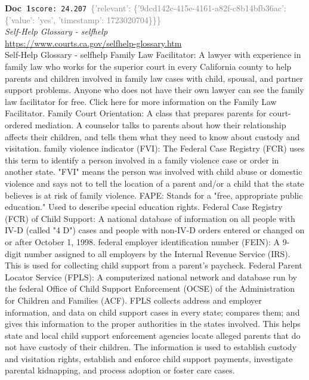 \documentclass[a4paper,11pt]{article}
\begin{document}
\begin{docenv}
{\footnotesize\textcolor{doccolor}{\textbf{Doc~1}}}\hfill{\tiny\texttt{score:~24.207}}\ {\tiny\textcolor{gray}{\{'relevant': \{'9dcd142c-415e-4161-a82f-c8b14bfb36ac': \{'value': 'yes', 'timestamp': 1723020704\}\}\}}}\\[3pt]
{\small\textit{Self-Help Glossary - selfhelp}}\\[2pt]
{\tiny\url{https://www.courts.ca.gov/selfhelp-glossary.htm}}\\[4pt]
{\footnotesize Self-Help Glossary - selfhelp
Family Law Facilitator: A lawyer with experience in family law who works for the superior court in every California county to help parents and children involved in family law cases with child, spousal, and partner support problems. Anyone who does not have their own lawyer can see the family law facilitator for free. Click here for more information on the Family Law Facilitator.
Family Court Orientation: A class that prepares parents for court-ordered mediation. A counselor talks to parents about how their relationship affects their children, and tells them what they need to know about custody and visitation.
family violence indicator (FVI): The Federal Case Registry (FCR) uses this term to identify a person involved in a family violence case or order in another state. "FVI" means the person was involved with child abuse or domestic violence and says not to tell the location of a parent and/or a child that the state believes is at risk of family violence.
FAPE: Stands for a "free, appropriate public education." Used to describe special education rights.
Federal Case Registry (FCR) of Child Support: A national database of information on all people with IV-D (called "4 D") cases and people with non-IV-D orders entered or changed on or after October 1, 1998.
federal employer identification number (FEIN): A 9-digit number assigned to all employers by the Internal Revenue Service (IRS). This is used for collecting child support from a parent's paycheck.
Federal Parent Locator Service (FPLS): A computerized national network and database run by the federal Office of Child Support Enforcement (OCSE) of the Administration for Children and Families (ACF). FPLS collects address and employer information, and data on child support cases in every state; compares them; and gives this information to the proper authorities in the states involved. This helps state and local child support enforcement agencies locate alleged parents that do not have custody of their children. The information is used to establish custody and visitation rights, establish and enforce child support payments, investigate parental kidnapping, and process adoption or foster care cases.}
\end{docenv}
\end{document}
